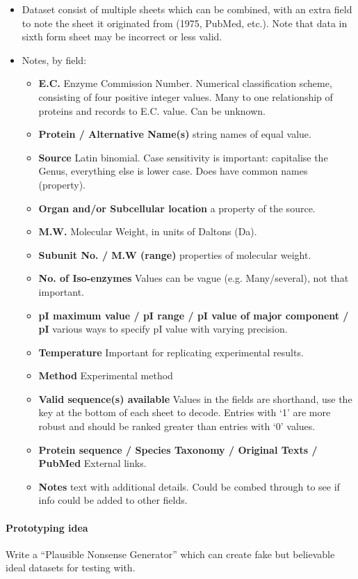 \begin{itemize}
\item Dataset consist of multiple sheets which can be combined, with an extra
  field to note the sheet it originated from (1975, PubMed, etc.). Note that
  data in sixth form sheet may be incorrect or less valid.
\item Notes, by field:
  \begin{itemize}
  \item \textbf{E.C.} Enzyme Commission Number. Numerical classification scheme,
    consisting of four positive integer values. Many to one relationship of
    proteins and records to E.C. value. Can be unknown.
  \item \textbf{Protein / Alternative Name(s)} string names of equal value.
  \item \textbf{Source} Latin binomial. Case sensitivity is important:
    capitalise the Genus, everything else is lower case. Does have common names
    (property).
  \item \textbf{Organ and/or Subcellular location} a property of the source.
  \item \textbf{M.W.} Molecular Weight, in units of Daltons (Da).
  \item \textbf{Subunit No. / M.W (range)} properties of molecular weight.
  \item \textbf{No. of Iso-enzymes} Values can be vague (e.g. Many/several), not
    that important.
  \item \textbf{pI maximum value / pI range / pI value of major component / pI}
    various ways to specify pI value with varying precision.
  \item \textbf{Temperature} Important for replicating experimental results.
  \item \textbf{Method} Experimental method
  \item \textbf{Valid sequence(s) available} Values in the fields are shorthand,
    use the key at the bottom of each sheet to decode. Entries with `1' are more
    robust and should be ranked greater than entries with `0' values.
  \item \textbf{Protein sequence / Species Taxonomy / Original Texts / PubMed}
    External links.
  \item \textbf{Notes} text with additional details. Could be combed through to
    see if info could be added to other fields.
  \end{itemize}
\end{itemize}

\paragraph{Prototyping idea} Write a ``Plausible Nonsense Generator'' which can
create fake but believable ideal datasets for testing with.

